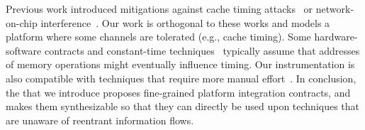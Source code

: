 Previous work introduced mitigations against cache timing attacks~\cite{kar2023mitigating,saileshwar2021mirage,giner2023scatter,werner2019scattercache,qureshi2018ceaser} or network-on-chip interference~\cite{wassel2013surfnoc,wang2012efficient,schoeberl2012statically,psarras2015phasenoc,alonso2019low,sadeghi2019toward}.
Our work is orthogonal to these works and models a platform where some channels are tolerated (e.g., cache timing).
Some hardware-software contracts and constant-time techniques~\cite{guarnieri2021hardware,wang2023specification,tan2025contractshadowlogic} typically assume that addresses of memory operations might eventually influence timing.
Our instrumentation is also compatible with techniques that require more manual effort~\cite{fastpath}.
In conclusion, the \PICI that we introduce proposes fine-grained platform integration contracts, and makes them synthesizable so that they can directly be used upon techniques that are unaware of reentrant information flows.
